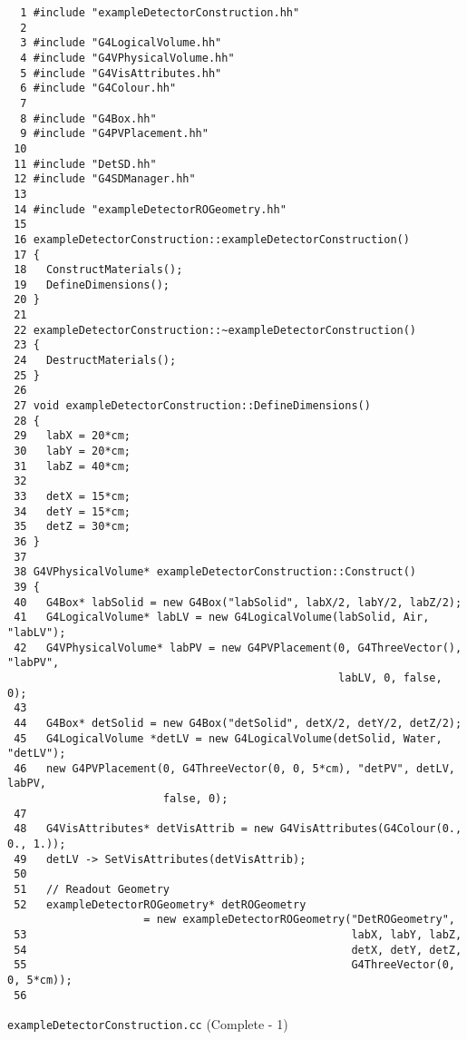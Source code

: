 \begin{code}[p]
\begin{lstlisting}
  1 #include "exampleDetectorConstruction.hh"
  2 
  3 #include "G4LogicalVolume.hh"
  4 #include "G4VPhysicalVolume.hh"
  5 #include "G4VisAttributes.hh"
  6 #include "G4Colour.hh"
  7 
  8 #include "G4Box.hh"
  9 #include "G4PVPlacement.hh"
 10 
 11 #include "DetSD.hh"
 12 #include "G4SDManager.hh"
 13 
 14 #include "exampleDetectorROGeometry.hh"
 15 
 16 exampleDetectorConstruction::exampleDetectorConstruction()
 17 {
 18   ConstructMaterials();
 19   DefineDimensions();
 20 }
 21 
 22 exampleDetectorConstruction::~exampleDetectorConstruction()
 23 {
 24   DestructMaterials();
 25 }
 26 
 27 void exampleDetectorConstruction::DefineDimensions()
 28 {
 29   labX = 20*cm;
 30   labY = 20*cm;
 31   labZ = 40*cm;
 32 
 33   detX = 15*cm;
 34   detY = 15*cm;
 35   detZ = 30*cm;
 36 }
 37 
 38 G4VPhysicalVolume* exampleDetectorConstruction::Construct()
 39 {
 40   G4Box* labSolid = new G4Box("labSolid", labX/2, labY/2, labZ/2);
 41   G4LogicalVolume* labLV = new G4LogicalVolume(labSolid, Air, "labLV");
 42   G4VPhysicalVolume* labPV = new G4PVPlacement(0, G4ThreeVector(), "labPV",
                                                   labLV, 0, false, 0);
 43 
 44   G4Box* detSolid = new G4Box("detSolid", detX/2, detY/2, detZ/2);
 45   G4LogicalVolume *detLV = new G4LogicalVolume(detSolid, Water, "detLV");
 46   new G4PVPlacement(0, G4ThreeVector(0, 0, 5*cm), "detPV", detLV, labPV,
                        false, 0);
 47 
 48   G4VisAttributes* detVisAttrib = new G4VisAttributes(G4Colour(0., 0., 1.));
 49   detLV -> SetVisAttributes(detVisAttrib);
 50 
 51   // Readout Geometry
 52   exampleDetectorROGeometry* detROGeometry
                     = new exampleDetectorROGeometry("DetROGeometry",
 53                                                  labX, labY, labZ,
 54                                                  detX, detY, detZ,
 55                                                  G4ThreeVector(0, 0, 5*cm));
 56 
\end{lstlisting}
\caption{\texttt{exampleDetectorConstruction.cc} (Complete - 1) \label{code-4-11}}
\end{code}


